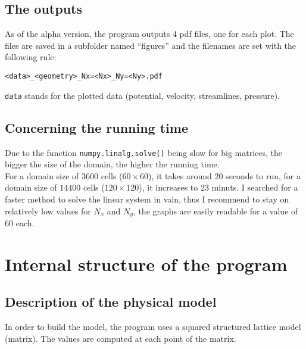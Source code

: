 \subsection{The outputs}
As of the alpha version, the program outputs 4 pdf files, one for each plot.
The files are saved in a subfolder named ``figures'' and the filenames are set
with the following rule:\\
\begin{center}
      \texttt{<data>_<geometry>_Nx=<Nx>_Ny=<Ny>.pdf}
\end{center}
\texttt{data} stands for the plotted data (potential, velocity,
streamlines, pressure).
\subsection{Concerning the running time}
Due to the function \texttt{numpy.linalg.solve()} being slow for
big matrices, the bigger the size of the domain, the higher the running time.\\
For a domain size of $\num{3600}$ cells ($\num{60} \times \num{60}$), it takes
around $\num{20}$ seconds to run, for a domain size of $\num{14400}$ cells
($\num{120} \times \num{120}$), it increases to $\num{23}$ minuts. 
\smallbreak
I searched for a faster method to solve the linear system in vain, thus I
recommend to stay on relatively low values for $N_x$ and $N_y$, the graphs are
easily readable for a value of $\num{60}$ each.\\

\section{Internal structure of the program}
\subsection{Description of the physical model}
In order to build the model, the program uses a squared structured lattice
model (matrix). The values are computed at each point of the matrix.
